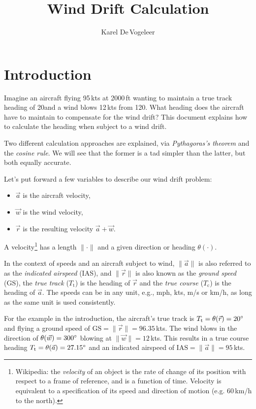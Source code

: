 \documentclass[a4paper,10pt]{article}
\title{Wind Drift Calculation}
\author{Karel De\,Vogeleer}
\begin{document}
\maketitle

\section{Introduction}

Imagine an aircraft flying 95\,kts at 2000\,ft wanting to maintain a true track heading of 20\degree and a wind blows 12\,kts from 120\degree.
What heading does the aircraft have to maintain to compensate for the wind drift?
This document explains how to calculate the heading when subject to a wind drift.

Two different calculation approaches are explained, via \emph{Pythagoras's theorem} and the \emph{cosine rule}.
We will see that the former is a tad simpler than the latter, but both equally accurate.

Let's put forward a few variables to describe our wind drift problem:
\begin{itemize}
 \item $\vec{a}$ is the aircraft velocity,
 \item $\vec{w}$ is the wind velocity,
 \item $\vec{r}$ is the resulting velocity $\vec{a}+\vec{w}$.
\end{itemize}
A velocity\footnote{Wikipedia: the \emph{velocity} of an object is the rate of change of its position with respect to a frame of reference, and is a function of time. Velocity is equivalent to a specification of its speed and direction of motion (e.g. 60\,km/h to the north).} has a length $\|\cdot\|$ and a given direction or heading $\theta(\cdot)$.

In the context of speeds and an aircraft subject to wind, $\|\vec{a}\|$ is also referred to as the \emph{indicated airspeed} (IAS), and $\|\vec{r}\|$ is also known as the \emph{ground speed} (GS), the \emph{true track} ($T_\mathrm{t}$) is the heading of $\vec{r}$ and the \emph{true course} ($T_\mathrm{c}$) is the heading of $\vec{a}$.
The speeds can be in any unit, e.g., mph, kts, m/s or km/h, as long as the same unit is used consistently.

For the example in the introduction, the aircraft's true track is $T_\mathrm{t}=\theta(\vec{r})=20\degree$ and flying a ground speed of $\mathrm{GS}=\|\vec{r}\|=96.35$\,kts.
The wind blows in the direction of  $\theta(\vec{w})=300\degree$ blowing at $\|\vec{w}\|=12$\,kts.
This results in a true course heading $T_\mathrm{t}=\theta(\vec{a})=27.15\degree$ and an indicated airspeed of $\mathrm{IAS}=\|\vec{a}\|=95$\,kts.
\end{document}
